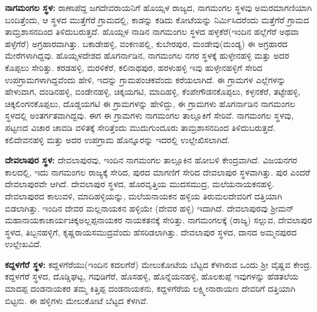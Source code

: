 \textbf{ನಾಗಮಂಗಲ ಸ್ಥಳ:} ರಾಣಾಪೆದ್ದ ಜಗದೇವರಾಯನಿಗೆ ಹೊಯ್ಸಳ ರಾಜ್ಯದ, ನಾಗಮಂಗಲ ಸ್ಥಳವು ಅಮರಮಾಗಣಿ\-ಯಾಗಿ ಬಂದಿತ್ತೆಂದು, ಆ ಸ್ಥಳದ ಮುತ್ತೆಗೆರೆ ಗ್ರಾಮದಲ್ಲಿ, ಕಾಡನ್ನು ಕಡಿದು ಕೋಟೆಯನ್ನು ನಿರ್ಮಿಸಿದರೆಂದು ಮತ್ತೆಗೆರೆ ಗ್ರಾಮದ ತಾಮ್ರಶಾಸನದಿಂದ ತಿಳಿದುಬರುತ್ತದೆ. ಹೊಯ್ಸಳ ನಾಡಿನ ನಾಗಮಂಗಲ ಸ್ಥಳದ ಹಳ್ಳಕೆರೆ(ಇಂದಿನ ಹಲ್ಲೆಗೆರೆ ಅಥವಾ ಹಳ್ಳೆಗೆರೆ) ಅಗ್ರಹಾರವಾಗಿತ್ತು. ಬಕಾಡೇಹಳ್ಳಿ, ವಂಕಣಪಲ್ಲಿ, ಕುಬೇರಪುರ, ಮಂಡೇವು(ಮಂಡ್ಯ) ಈ ಅಗ್ರಹಾರದ ಮೇರೆಗಳಾಗಿದ್ದವು. ಹೊಯ್ಸಳದೇಶದ ಹೊಗರ್ನಾಡಿನ, ನಾಗಮಂಗಲ ನಗರ ಸ್ಥಳಕ್ಕೆ ಹುಳ್ಳೇನಹಳ್ಳಿ ಮತ್ತು ಅದರ ಕೊಪ್ಪಲು ಸೇರಿತ್ತು. ಕರಡಹಳ್ಳಿ, ಮರಳಿಕೆರೆ, ಕಲಿನಾಥಪುರ, ಹರಳುಹಳ್ಳಿ ಇವು ಹುಳ್ಳೇನಹಳ್ಳಿಗೆ ಸೇರಿದ ಉಪಗ್ರಾಮಗಳಾಗಿದ್ದವೆಂದು ಹೇಳಿ, ಇದನ್ನು ಗ್ರಾಮಪಂಚಕವೆಂದು ಕರೆಯಲಾಗಿದೆ. ಈ ಗ್ರಾಮಗಳ ಎಲ್ಲೆಗಳನ್ನು ಹೇಳುವಾಗ, ದಂಡಿನಹಳ್ಳಿ, ಬಿಂಡೇನಹಳ್ಳಿ, ಚಿಕ್ಕಯಗಟಿ, ಮಾದಿಹಳ್ಳಿ, ಕೆಂಪೇಗೌಡನಕೊಪ್ಪಲು, ಕಳ್ಳನಕೆರೆ, ತಟ್ಟೇಹಳ್ಳಿ, ಚಿಕ್ಕಲಿಂಗನಕೊಪ್ಪಲು, ದೊಡ್ಡಯಗಟಿ ಈ ಗ್ರಾಮಗಳನ್ನು ಹೇಳಿದ್ದು, ಈ ಗ್ರಾಮಗಳು ಹೊಗರ್ನಾಡಿನ ನಾಗಮಂಗಲ ಸ್ಥಳದಲ್ಲಿ ಅಂತರ್ಗತವಾಗಿದ್ದವು. ಈಗ ಈ ಗ್ರಾಮಗಳು ನಾಗಮಂಗಲ ತಾಲ್ಲೂಕಿಗೆ ಸೇರಿವೆ. ನಾಗಮಂಗಲ ಸ್ಥಳವು, ಪಟ್ಟಣದ ವಿಚಾರ ಚಾವಡಿ ವಳಿತಕ್ಕೆ ಸೇರಿತ್ತೆಂದು ಮುದುಗುಂದೂರು ತಾಮ್ರಶಾಸನದಿಂದ ತಿಳಿದುಬರುತ್ತದೆ. ಕಲಿದೇವನಹಳ್ಳಿ ಮತ್ತು ಅದರ ಉಪಗ್ರಾಮ ಹೊನ್ನೂರನ್ನು ಇದರಲ್ಲಿ ಉಲ್ಲೇಖಿಸಲಾಗಿದೆ.

\textbf{ದೇವಲಾಪುರ ಸ್ಥಳ:} ದೇವಲಾಪುರವು, ಇಂದಿನ ನಾಗಮಂಗಲ ತಾಲ್ಲೂಕಿನ ಹೋಬಳಿ ಕೇಂದ್ರವಾಗಿದೆ. ವಿಜಯನಗರ ಕಾಲದಲ್ಲಿ, ಇದು ನಾಗಮಂಗಲ ರಾಜ್ಯಕ್ಕೆ ಸೇರಿದ, ಪುರದ ಮಾಗಣಿಗೆ ಸೇರಿದ ದೇವಲಾಪುರ ಸ್ಥಳವಾಗಿತ್ತು. ಪುರ ಎಂದರೆ ದೇವಲಾಪುರವೇ ಆಗಿದೆ. ದೇವಲಾಪುರ ಸ್ಥಳದ, ಹೊರವೃತ್ತಿಯ ಮುದಸಮುದ್ರ, ಮಲೆಯನಾಯಕನಹಳ್ಳಿ. ದೇವಲಾಪುರದ ಕಾಲುವಳಿ, ಮಾದಿಹಳ್ಳಿಯನ್ನು, ಮಲೆಯನಾಯಕನ ಹಳ್ಳಿಯ ತಿರುಮಲದೇವರಿಗೆ ದತ್ತಿಯಾಗಿ ಬಿಡಲಾಗಿತ್ತು. ಇಂದಿನ ದೇವರ ಮಲ್ಲನಾಯಕನ ಹಳ್ಳಿಯೇ (ದೇವರ ಹಳ್ಳಿ) ಇದಾಗಿದೆ. ದೇವಲಾಪುರವು ಶ‍್ರೀಮನ್​ಮಹಾನಾಯಕಾಚಾರ್ಯ\break ಚಿಕ್ಕಅಲ್ಲಪ್ಪನಾಯಕರ ನಾಯಕತನಕ್ಕೆ ಸೇರಿತ್ತು. ನಾಗಮಂಗಲಕ್ಕೆ (ರಾಜ್ಯ) ಸಲ್ಲುವ, ದೇವಲಾಪುರ ಸ್ಥಳದ, ತಿಬ್ಬನಹಳ್ಳಿಗೆ, ಕೃಷ್ಣರಾಯಸಮುದ್ರವೆಂದು ಹೆಸರಿಡಲಾಗಿತ್ತು. ದೇವಲಾಪುರ ಸ್ಥಳದ, ದಾನದ ಅಮ್ಮನಪುರದ ಉಲ್ಲೇಖವಿದೆ.

\textbf{ಕದ್ದಳಗೆರೆ ಸ್ಥಳ:} ಕದ್ದಳಗೆರೆಯು(ಇಂದಿನ ಕದಲಗೆರೆ) ಮೇಲುಕೋಟೆಯ ಬೆಟ್ಟದ ಕೆಳಗಿರುವ ಒಂದು ಶ‍್ರೀ ವೈಷ್ಣವ ಕೇಂದ್ರ. ಕದ್ದಳಗೆರೆ ಸ್ಥಳದ, ದೊಡ್ಡಿಘಟ್ಟ, ಗವುಡಿಗೆರೆ, ಹೊಸಹಳ್ಳಿ, ಹೊನ್ನೆಯನಹಳ್ಳಿ, ಹೊಲಕುಪ್ಪೆ ಇವುಗಳನ್ನು ಹೆಡತಲೆಯ ಮಾದಪ್ಪ ದಂಡನಾಯಕರ ತಮ್ಮ ಕಿತ್ತಿಪ್ಪ ದಂಡನಾಯಕನು, ಕದ್ದಳಗೆರೆಯ ಲಕ್ಷ್ಮೀನಾರಾಯಣ ದೇವರಿಗೆ ದತ್ತಿಯಾಗಿ ಬಿಟ್ಟನು. ಈ ಹಳ್ಳಿಗಳು ಮೇಲುಕೋಟೆ ಬೆಟ್ಟದ ಕೆಳಗಿವೆ.

